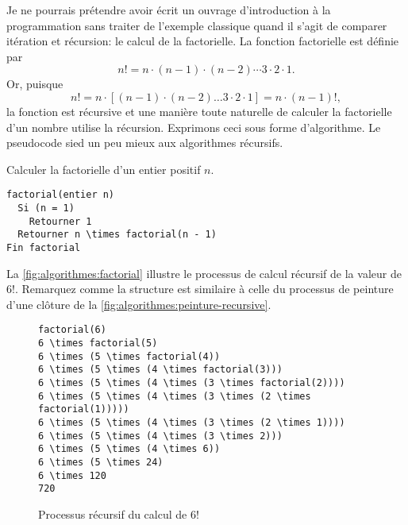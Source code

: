 Je ne pourrais prétendre avoir écrit un ouvrage d'introduction à la
programmation sans traiter de l'exemple classique quand il s'agit de
comparer itération et
récursion: le calcul de la
factorielle. La fonction factorielle est définie
par
\begin{equation*}
  n! = n \cdot (n - 1) \cdot (n - 2) \cdots 3 \cdot 2 \cdot 1.
\end{equation*}
Or, puisque
\begin{equation*}
  n! = n \cdot [(n - 1) \cdot (n - 2) \dots 3 \cdot 2 \cdot 1] =
  n \cdot (n - 1)!,
\end{equation*}
la fonction est récursive et une manière toute naturelle de calculer
la factorielle d'un nombre utilise la récursion. Exprimons ceci sous
forme d'algorithme. Le pseudocode sied un peu mieux aux algorithmes
récursifs.

\begin{algorithme}
  \label{algo:algorithmes:factorielle-recursive}
  Calculer la factorielle d'un entier positif $n$.
  \begin{Schunk}
\begin{Verbatim}[commandchars=\\\{\}]
factorial(entier n)
  Si (n = 1)
    Retourner 1
  Retourner n \times factorial(n - 1)
Fin factorial
\end{Verbatim}
  \end{Schunk}
\end{algorithme}

La \autoref{fig:algorithmes:factorial} illustre le processus de calcul
récursif de la valeur de $6!$. Remarquez comme la structure est
similaire à celle du processus de peinture d'une clôture de la
\autoref{fig:algorithmes:peinture-recursive}.

\begin{figure}
  \centering
  \begin{minipage}{0.67\linewidth}
\begin{Verbatim}[commandchars=\\\{\}]
factorial(6)
6 \times factorial(5)
6 \times (5 \times factorial(4))
6 \times (5 \times (4 \times factorial(3)))
6 \times (5 \times (4 \times (3 \times factorial(2))))
6 \times (5 \times (4 \times (3 \times (2 \times factorial(1)))))
6 \times (5 \times (4 \times (3 \times (2 \times 1))))
6 \times (5 \times (4 \times (3 \times 2)))
6 \times (5 \times (4 \times 6))
6 \times (5 \times 24)
6 \times 120
720
\end{Verbatim}
  \end{minipage}
  \caption{Processus récursif du calcul de $6!$}
  \label{fig:algorithmes:factorial}
\end{figure}

